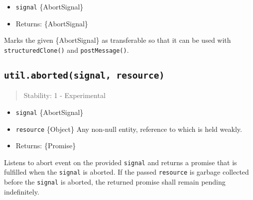 \begin{itemize}
\tightlist
\item
  \texttt{signal} \{AbortSignal\}
\item
  Returns: \{AbortSignal\}
\end{itemize}

Marks the given \{AbortSignal\} as transferable so that it can be used
with \texttt{structuredClone()} and \texttt{postMessage()}.

\begin{Shaded}
\begin{Highlighting}[]
\OperatorTok{=} \NormalTok{(}\NormalTok{))}\OperatorTok{;}
\OperatorTok{=}  \NormalTok{()}\OperatorTok{;}
\OperatorTok{,}\NormalTok{ [signal])}\OperatorTok{;}
\end{Highlighting}
\end{Shaded}

\subsection{\texorpdfstring{\texttt{util.aborted(signal,\ resource)}}{util.aborted(signal, resource)}}\label{util.abortedsignal-resource}

\begin{quote}
Stability: 1 - Experimental
\end{quote}

\begin{itemize}
\tightlist
\item
  \texttt{signal} \{AbortSignal\}
\item
  \texttt{resource} \{Object\} Any non-null entity, reference to which
  is held weakly.
\item
  Returns: \{Promise\}
\end{itemize}

Listens to abort event on the provided \texttt{signal} and returns a
promise that is fulfilled when the \texttt{signal} is aborted. If the
passed \texttt{resource} is garbage collected before the \texttt{signal}
is aborted, the returned promise shall remain pending indefinitely.

